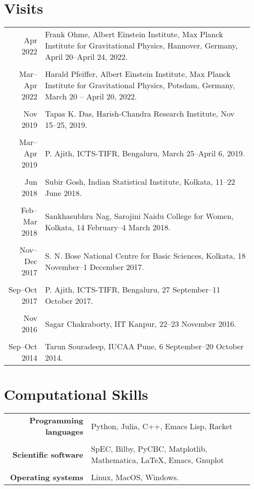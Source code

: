\documentclass[12pt]{article}
\begin{document}
\section{Visits}
\begin{longtable}{rp{14cm}}
Apr 2022 & Frank Ohme, Albert Einstein Institute, Max Planck Institute for Gravitational Physics, Hannover, Germany, April 20--April 24, 2022.\\\\
Mar--Apr 2022 & Harald Pfeiffer, Albert Einstein Institute, Max Planck Institute for Gravitational Physics, Potsdam, Germany, March 20 -- April 20, 2022.\\\\
Nov 2019 & Tapas K. Das, Harish-Chandra Research Institute, Nov 15–25, 2019.\\\\
Mar--Apr 2019 & P. Ajith, ICTS-TIFR, Bengaluru, March 25–April 6, 2019.\\\\
Jun 2018 & Subir Gosh, Indian Statistical Institute, Kolkata, 11–22 June 2018.\\\\
Feb--Mar 2018 & Sankhasubhra Nag, Sarojini Naidu College for Women, Kolkata, 14 February–4 March 2018.\\\\
Nov--Dec 2017 & S. N. Bose National Centre for Basic Sciences, Kolkata, 18 November–1 December 2017.\\\\
Sep--Oct 2017 & P. Ajith, ICTS-TIFR, Bengaluru, 27 September–11 October 2017.\\\\
Nov 2016 & Sagar Chakraborty, IIT Kanpur, 22–23 November 2016.\\\\
Sep--Oct 2014 & Tarun Souradeep, IUCAA Pune, 6 September–20 October 2014.
\end{longtable}

\section{Computational Skills}
\begin{longtable}{rp{14cm}}
{\bfseries Programming languages} & Python, Julia, C++, Emacs Lisp, Racket\\\\
{\bfseries Scientific software} & SpEC, Bilby, PyCBC, Matplotlib, Mathematica, \LaTeX, Emacs, Gnuplot\\\\
{\bfseries Operating systems} & Linux, MacOS, Windows.
\end{longtable}
\end{document}
